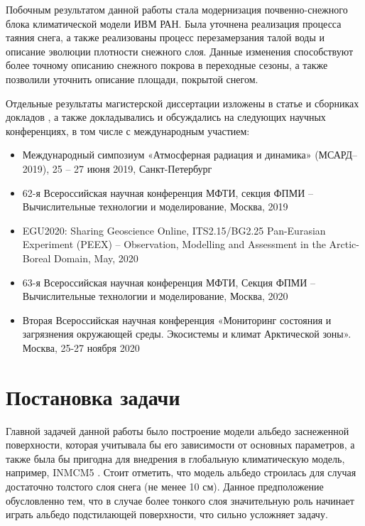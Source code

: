 \documentclass[a4paper, fontsize=14pt]{scrartcl}
\begin{document}
Побочным результатом данной работы стала модернизация почвенно-снежного блока климатической модели ИВМ РАН. Была уточнена реализация процесса таяния снега, а также реализованы процесс перезамерзания талой воды и описание эволюции плотности снежного слоя. Данные изменения способствуют более точному описанию снежного покрова в переходные сезоны, а также позволили уточнить описание площади, покрытой снегом. \sloppy 

Отдельные результаты магистерской диссертации изложены в статье \cite{Chernenkov2021rus} и сборниках докладов \cite{MSARD2019, mipt2019, EGU2020poster, EGU2020, mipt2020, Arctic2020}, а также докладывались и обсуждались на следующих научных конференциях, в том числе с международным участием:
\begin{itemize}
    \item Международный симпозиум «Атмосферная радиация и динамика» (МСАРД–2019), 25 – 27 июня 2019, Санкт-Петербург \cite{MSARD2019}
    \item 62-я Всероссийская научная конференция МФТИ, секция ФПМИ – Вычислительные технологии и моделирование, Москва, 2019 \cite{mipt2019}
    \item EGU2020: Sharing Geoscience Online, ITS2.15/BG2.25 Pan-Eurasian Experiment (PEEX) – Observation, Modelling and Assessment in the Arctic-Boreal Domain, May, 2020 \cite{EGU2020poster, EGU2020} \sloppy 
    \item 63-я Всероссийская научная конференция МФТИ, Секция ФПМИ – Вычислительные технологии и моделирование, Москва, 2020 \cite{mipt2020}
    \item Вторая Всероссийская научная конференция «Мониторинг состояния и загрязнения окружающей среды. Экосистемы и климат Арктической зоны». Москва, 25-27 ноября 2020 \cite{Arctic2020}
\end{itemize} \sloppy 



\newpage
\section{Постановка задачи}

Главной задачей данной работы было построение модели альбедо заснеженной поверхности, которая учитывала бы его зависимости от основных параметров, а также была бы пригодна для внедрения в глобальную климатическую модель, например, INMCM5 \cite{Volodin2017rus}. Стоит отметить, что модель альбедо строилась для случая достаточно толстого слоя снега (не менее 10 см). Данное предположение обусловленно тем, что в случае более тонкого слоя значительную роль начинает играть альбедо подстилающей поверхности, что сильно усложняет задачу. 
\end{document}
